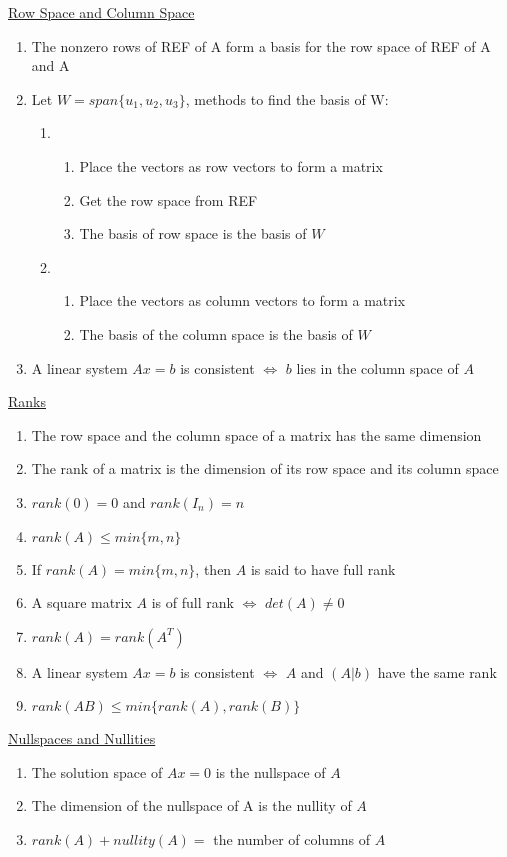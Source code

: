 \documentclass[a4paper,1pt,landscape]{article}
\begin{document}
\begin{multicols}{3}
\underline{Row Space and Column Space}
\begin{enumerate}
\item The nonzero rows of REF of A form a basis for the row space of REF of A and A
\item Let $W = span\{u_1, u_2, u_3\}$, methods to find the basis of W:
\begin{enumerate}
    \item \begin{enumerate}
        \item Place the vectors as row vectors to form a matrix
        \item Get the row space from REF
        \item The basis of row space is the basis of $W$
    \end{enumerate}
    \item \begin{enumerate}
        \item Place the vectors as column vectors to form a matrix
        \item The basis of the column space is the basis of $W$
        \end{enumerate}
\end{enumerate}
\item A linear system $Ax = b$ is consistent $\Leftrightarrow$ $b$ lies in the column space of $A$
\end{enumerate}

\underline{Ranks}
\begin{enumerate}
\item The row space and the column space of a matrix has the same dimension
\item The rank of a matrix is the dimension of its row space and its column space
\item $rank(0) = 0$ and $rank(I_n) = n$
\item $rank(A) \leq min\{m, n\}$
\item If $rank(A) = min\{m, n\}$, then $A$ is said to have full rank
\item A square matrix $A$ is of full rank $\Leftrightarrow$ $det(A) \neq 0$
\item $rank(A) = rank(A^T)$
\item A linear system $Ax = b$ is consistent $\Leftrightarrow$ $A$ and $(A|b)$ have the same rank
\item $rank(AB) \leq min\{rank(A), rank(B)\}$
\end{enumerate}

\underline{Nullspaces and Nullities}
\begin{enumerate}
\item The solution space of $Ax = 0$ is the nullspace of $A$
\item The dimension of the nullspace of A is the nullity of $A$
\item $rank(A) + nullity(A) =$ the number of columns of $A$
\end{enumerate}


\end{multicols}
\end{document}
